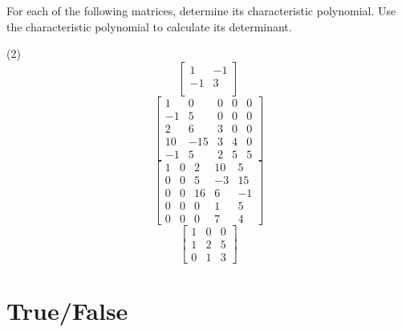 For each of the following matrices, determine its characteristic
polynomial.  Use the characteristic polynomial to calculate its
determinant.
\begin{tasks}[resume, style=enumerate](2)
\task
  \begin{displaymath}
    \begin{bmatrix}
      1 & -1\\
      -1 & 3 \\
    \end{bmatrix}
  \end{displaymath}
\task
  \begin{displaymath}
    \begin{bmatrix}
      1 & 0 & 0 & 0 & 0 \\
      -1 & 5 & 0 & 0 & 0 \\
      2 & 6 & 3 & 0 & 0 \\
      10 & -15 & 3 & 4 & 0 \\
      -1 & 5 & 2 & 5 & 5
    \end{bmatrix}
  \end{displaymath}
\task
  \begin{displaymath}
    \begin{bmatrix}
      1 & 0 & 2 & 10 & 5 \\
      0 & 0 & 5 & -3 & 15 \\
      0 & 0 & 16 & 6 & -1 \\
      0 & 0 & 0 & 1 & 5\\
      0 & 0 & 0 & 7 & 4
    \end{bmatrix}
  \end{displaymath}
\task
  \begin{displaymath}
    \begin{bmatrix}
      1 & 0 & 0 \\
      1 & 2 & 5 \\
      0 & 1 & 3
    \end{bmatrix}
  \end{displaymath}
\end{tasks}

\section{True/False}

\trueFalseHeader


